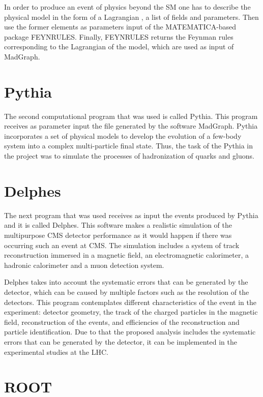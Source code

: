 In order to produce an event of physics beyond the SM one has to describe the physical model in the form of a Lagrangian , a list of fields and parameters. Then use the former elements as parameters input of the MATEMATICA-based package FEYNRULES. Finally, FEYNRULES returns the Feynman rules corresponding to the Lagrangian of the model, which are used as input of MadGraph.


\section{Pythia}

The second computational program that was used is called Pythia. This program receives as parameter input the file generated by the software MadGraph. Pythia incorporates a set of physical models to develop the evolution of a few-body system into a complex multi-particle final state. Thus, the task of the Pythia in the project was to simulate the processes of hadronization of quarks and gluons.


\section{Delphes}

The next program that was used receives as input the events produced by Pythia and it is called Delphes. This software makes a realistic simulation of the multipurpose CMS detector performance as it would happen if there was occurring such an event at CMS. The simulation includes a system of track reconstruction immersed in a magnetic field, an electromagnetic calorimeter, a hadronic calorimeter and a muon detection system.

Delphes takes into account the systematic errors that can be generated by the detector, which can be caused by multiple factors such as the resolution of the detectors. This program contemplates different characteristics of the event in the experiment: detector geometry, the track of the charged particles in the magnetic field, reconstruction of the events, and efficiencies of the reconstruction and particle identification. Due to that the proposed analysis includes the systematic errors that can be generated by the detector, it can be implemented in the experimental studies at the LHC. 

\section{ROOT}

